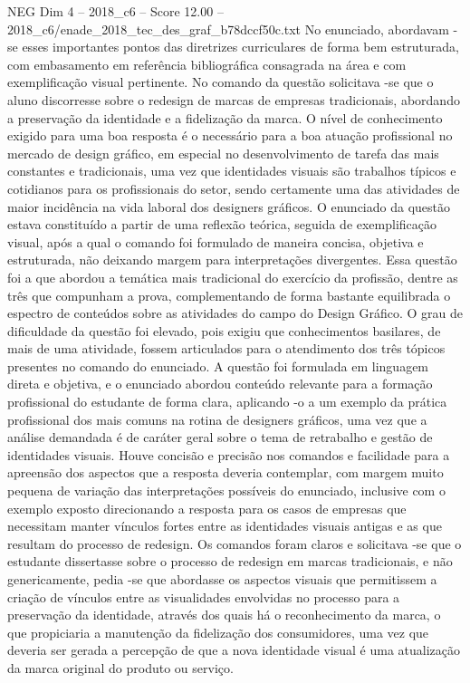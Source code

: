 \begin{textsample}{NEG Dim 4 – 2018\_c6 – Score 12.00 – 2018\_c6/enade\_2018\_tec\_des\_graf\_b78dccf50c.txt}
No enunciado, abordavam -se esses importantes pontos das diretrizes curriculares de forma bem estruturada, com embasamento em referência bibliográfica consagrada na área e com exemplificação visual pertinente.
No comando da questão solicitava -se que o aluno discorresse sobre o redesign de marcas de empresas tradicionais, abordando a preservação da identidade e a fidelização da marca.
O nível de conhecimento exigido para uma boa resposta é o necessário para a boa atuação profissional no mercado de design gráfico, em especial no desenvolvimento de tarefa das mais constantes e tradicionais, uma vez que identidades visuais são trabalhos típicos e cotidianos para os profissionais do setor, sendo certamente uma das atividades de maior incidência na vida laboral dos designers gráficos.
O enunciado da questão estava constituído a partir de uma reflexão teórica, seguida de exemplificação visual, após a qual o comando foi formulado de maneira concisa, objetiva e estruturada, não deixando margem para interpretações divergentes.
Essa questão foi a que abordou a temática mais tradicional do exercício da profissão, dentre as três que compunham a prova, complementando de forma bastante equilibrada o espectro de conteúdos sobre as atividades do campo do Design Gráfico.
O grau de dificuldade da questão foi elevado, pois exigiu que conhecimentos basilares, de mais de uma atividade, fossem articulados para o atendimento dos três tópicos presentes no comando do enunciado.
A questão foi formulada em linguagem direta e objetiva, e o enunciado abordou conteúdo relevante para a formação profissional do estudante de forma clara, aplicando -o a um exemplo da prática profissional dos mais comuns na rotina de designers gráficos, uma vez que a análise demandada é de caráter geral sobre o tema de retrabalho e gestão de identidades visuais.
Houve concisão e precisão nos comandos e facilidade para a apreensão dos aspectos que a resposta deveria contemplar, com margem muito pequena de variação das interpretações possíveis do enunciado, inclusive com o exemplo exposto direcionando a resposta para os casos de empresas que necessitam manter vínculos fortes entre as identidades visuais antigas e as que resultam do processo de redesign.
Os comandos foram claros e solicitava -se que o estudante dissertasse sobre o processo de redesign em marcas tradicionais, e não genericamente, pedia -se que abordasse os aspectos visuais que permitissem a criação de vínculos entre as visualidades envolvidas no processo para a preservação da identidade, através dos quais há o reconhecimento da marca, o que propiciaria a manutenção da fidelização dos consumidores, uma vez que deveria ser gerada a percepção de que a nova identidade visual é uma atualização da marca original do produto ou serviço.

\end{textsample}
